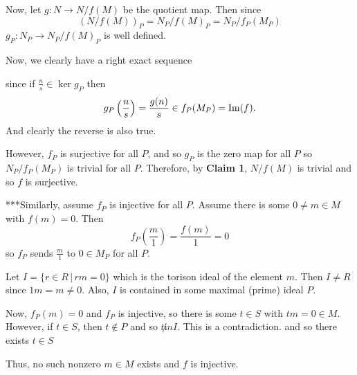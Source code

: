 \documentclass[12pt]{AlgebraQual}
\begin{document}
\begin{solution}
Now, let $g:N\to N/f(M)$ be the quotient map. Then since $$(N/f(M))_P=N_P/f(M)_P=N_P/f_P(M_P)$$ $g_P:N_P\to N_P/f(M)_P$ is well defined.

Now, we clearly have a right exact sequence
\begin{center}
\end{center}

since if $\frac{n}{s}\in\ker g_P$ then $$g_P\left(\frac{n}{s}\right)=\frac{g(n)}{s}\in f_P(M_P)=\text{Im}(f).$$ And clearly the reverse is also true.

However, $f_P$ is surjective for all $P$, and so $g_P$ is the zero map for all $P$ so $N_P/f_P(M_P)$ is trivial for all $P$. Therefore, by \textbf{Claim 1}, $N/f(M)$ is trivial and so $f$ is surjective.

\begin{mybox}
***Similarly, assume $f_P$ is injective for all $P$. Assume there is some $0\not=m\in M$ with $f(m)=0$. Then $$f_P\left(\frac{m}{1}\right)=\frac{f(m)}{1}=0$$ so $f_P$ sends $\frac{m}{1}$ to $0\in M_P$ for all $P$.

Let $I=\{r\in R\,|\,rm=0\}$ which is the torison ideal of the element $m$. Then $I\not=R$ since $1m=m\not=0$. Also, $I$ is contained in some maximal (prime) ideal $P$.

Now, $f_P(m)=0$ and $f_P$ is injective, so there is some $t\in S$ with $tm=0\in M$. However, if $t\in S$, then $t\notin P$ and so $t\not in I$. This is a contradiction. and so there exists $t\in S$

Thus, no such nonzero $m\in M$ exists and $f$ is injective.
\end{mybox}
\end{solution}
\newpage
\end{document}
